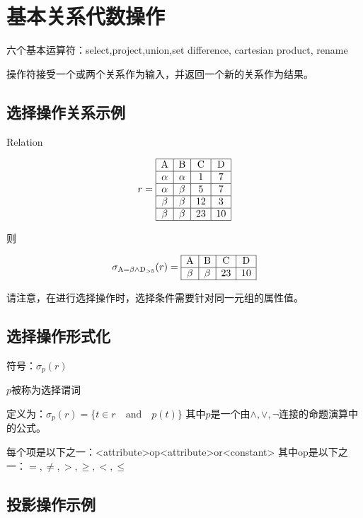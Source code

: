 \section{基本关系代数操作}

六个基本运算符：select,project,union,set difference, cartesian product, rename

操作符接受一个或两个关系作为输入，并返回一个新的关系作为结果。

\subsection{选择操作关系示例}

Relation 

\[
r=\begin{array}{|c|c|c|c|}
    \hline
    \mathrm{A} & \mathrm{B} & \mathrm{C} & \mathrm{D}\\ \hline
    \alpha & \alpha & 1 & 7 \\ \hline
    \alpha & \beta & 5 & 7 \\ \hline
    \beta & \beta & 12 & 3\\ \hline
    \beta & \beta & 23 & 10\\ \hline
\end{array}
\]

则

\[
\sigma_{\mathrm{A}=\beta \land \mathrm{D}_{>5}}(r)
=
\begin{array}{|c|c|c|c|}
  \hline
  \mathrm{A} & \mathrm{B} & \mathrm{C} & \mathrm{D} \\\hline
  \beta       & \beta       & 23          & 10          \\\hline
\end{array}
\]

请注意，在进行选择操作时，选择条件需要针对同一元组的属性值。

\subsection{选择操作形式化}

符号：$\sigma_p(r)$

$p$被称为选择谓词

定义为：$\sigma_p(r)=\{t\in r\quad \text{and}\quad p(t)\}$
其中$p$是一个由$\land,\lor,\lnot$连接的命题演算中的公式。

每个项是以下之一：<attribute>op<attribute>or<constant>
其中op是以下之一：$=,\neq,>,\geq,<,\leq$

\subsection{投影操作示例}

